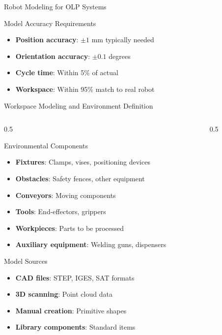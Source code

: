 \documentclass[10pt,aspectratio=169]{beamer}
\begin{document}
\begin{frame}{Robot Modeling for OLP Systems}
\begin{block}{Model Accuracy Requirements}
\begin{itemize}
\item \textbf{Position accuracy}: $\pm 1$ mm typically needed
\item \textbf{Orientation accuracy}: $\pm 0.1$ degrees
\item \textbf{Cycle time}: Within 5\% of actual
\item \textbf{Workspace}: Within 95\% match to real robot
\end{itemize}
\end{block}
\end{frame}

\begin{frame}{Workspace Modeling and Environment Definition}
\begin{columns}[T]
\begin{column}{0.5\textwidth}
\begin{block}{Environmental Components}
\begin{itemize}
\item \textbf{Fixtures}: Clamps, vises, positioning devices
\item \textbf{Obstacles}: Safety fences, other equipment
\item \textbf{Conveyors}: Moving components
\item \textbf{Tools}: End-effectors, grippers
\item \textbf{Workpieces}: Parts to be processed
\item \textbf{Auxiliary equipment}: Welding guns, dispensers
\end{itemize}
\end{block}
\begin{alertblock}{Model Sources}
\begin{itemize}
\item \textbf{CAD files}: STEP, IGES, SAT formats
\item \textbf{3D scanning}: Point cloud data
\item \textbf{Manual creation}: Primitive shapes
\item \textbf{Library components}: Standard items
\end{itemize}
\end{alertblock}
\end{column}
\begin{column}{0.5\textwidth}
\begin{center}
\end{center}
\end{column}
\end{columns}
\end{frame}
\end{document}
